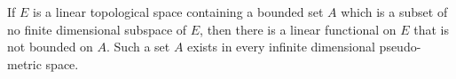 If $E$ is a linear topological space containing a bounded set $A$ which is a subset of no finite dimensional subspace of $E$, then there is a linear functional on $E$ that is not bounded on $A$. Such a set $A$ exists in every infinite dimensional pseudo-metric space.
